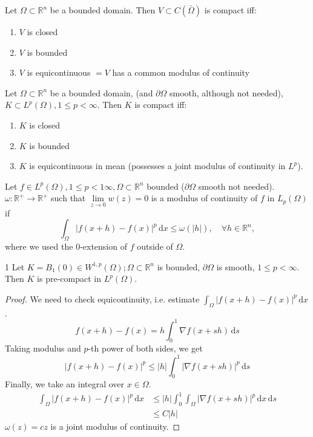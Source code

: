 \documentclass{report}
\begin{document}
{
    Let \(\Omega \subset \mathbb{R}^{n}\) be a bounded domain. Then \(V \subset C(\bar{\Omega})\) is compact iff:
    \begin{enumerate}
        \item \(V\)  is closed
        \item \(V\) is bounded
        \item \(V\) is equicontinuous \(= V\) has a common modulus of continuity
    \end{enumerate} 
}

{
    Let \(\Omega \subset \mathbb{R}^{n}\) be a bounded domain, (and \(\partial \Omega\) smooth, although not needed), \(K \subset L^{p}(\Omega), 1 \leq p < \infty\). Then \(K\) is compact iff:
    \begin{enumerate}
        \item \(K\) is closed
        \item \(K\) is bounded
        \item \(K\) is equicontinuous in mean (possesses a joint modulus of continuity in \(L^p\)).
    \end{enumerate} 
}

\dfn{}
{
    Let \(f \in L^p(\Omega), 1 \leq p <1 \infty, \Omega \subset \mathbb{R}^{n}\) bounded (\(\partial \Omega\) smooth not needed). \(\omega \colon \mathbb{R}^{+} \to \mathbb{R}^{+}\) such that \(\lim\limits_{z \to 0} w(z) = 0\) is a modulus of continuity of \(f\) in \(L_{p}(\Omega)\) if 
    \[
        \int_{\Omega} \vert f(x+h) - f(x) \vert ^p \,\mathrm{d}x \leq \omega(\vert h \vert ), \quad \forall h \in \mathbb{R}^n,
    \]
    where we used the \(0\)-extension of \(f\) outside of \(\Omega\). 
}

\begin{corollary}{}{1}
    Let \(K = B_{1}(0) \in W^{1, p}(\Omega); \Omega \subset \mathbb{R}^{n}\) is bounded, \(\partial \Omega\) is smooth, \(1 \leq p < \infty\). Then \(K\) is pre-compact in \(L^{p}(\Omega)\).
\end{corollary}

\begin{proof}
    We need to check equicontinuity, i.e. estimate \(\int_{\Omega} \vert f(x+h) - f(x) \vert ^p \,\mathrm{d}x \).
    \[
        f(x+h) - f(x) = h \int_{0}^{1} \nabla f(x + sh) \,\mathrm{d}s
    \]
    Taking modulus and \(p\)-th power of both sides, we get
    \[
        \vert f(x+h) - f(x) \vert ^p \leq \vert h \vert \int_{0}^{1} \vert \nabla f(x + sh) \vert ^p \,\mathrm{d}s 
    \]
    Finally, we take an integral over \(x \in \Omega\).
    \begin{align*}
        \int_{\Omega} \vert f(x+h) - f(x) \vert ^p \,\mathrm{d}x &\leq \vert h \vert \int_{0}^{1} \int_{\Omega} \vert \nabla f(x + sh) \vert ^p \,\mathrm{d}x \,\mathrm{d}s \\
        &\leq C \vert h \vert
    \end{align*}
    \(\omega(z) = cz\) is a joint modulus of continuity.
\end{proof}
\end{document}
